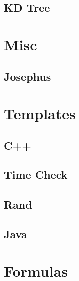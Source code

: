 \documentclass[10pt,a4paper]{report}
\begin{document}
	\section{KD Tree}
		
	
\chapter{Misc}
	\section{Josephus}
		
\chapter{Templates}
	\section{C++}
		
	\newpage
	\section{Time Check}
		
	\section{Rand}
		
	\newpage
	\section{Java}
		
	
\chapter{Formulas}
\end{document}
